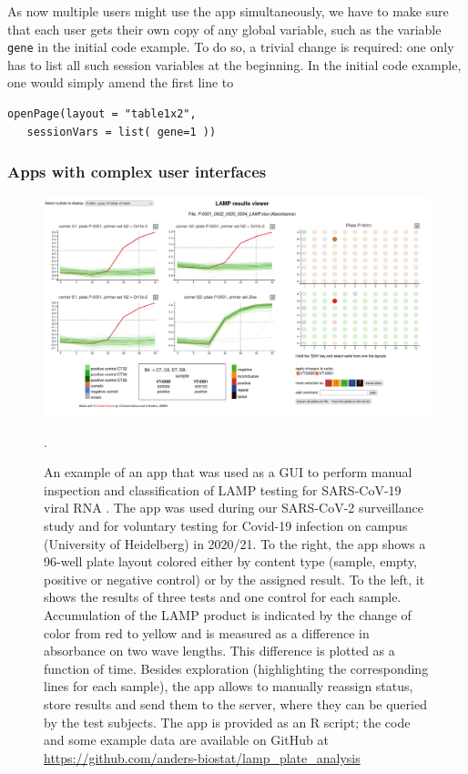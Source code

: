 \documentclass[twocolumn,10pt]{article}
\begin{document}
As now multiple users might use the app simultaneously, we have to make sure that each user gets their own copy of any global variable, such as the variable \texttt{gene} in the initial code example. To do so, a trivial change is required: one only has to list all such session variables at the beginning. In the initial code example, one would simply amend the first line to 
\begin{verbatim}
openPage(layout = "table1x2", 
   sessionVars = list( gene=1 ))
\end{verbatim}

\subsubsection{Apps with complex user interfaces}\label{gui_apps}

\begin{figure}[t]
   \includegraphics[width=\textwidth]{FigG/figG.png}
   \caption{An example of an app that was used as a GUI to perform manual inspection and classification of LAMP testing for SARS-CoV-19 viral RNA \citep{daothi_2020}. The app was used during our SARS-CoV-2 surveillance study \citep{deckert_2021} and for voluntary testing for Covid-19 infection on campus (University of Heidelberg) in 2020/21. To the right, the app shows a 96-well plate layout colored either by content type (sample, empty, positive or negative control) or by the assigned result. To the left, it shows the results of three tests and one control for each sample. Accumulation of the LAMP product is indicated by the change of color from red to yellow and is measured as a difference in absorbance on two wave lengths. This difference is plotted as a function of time. Besides exploration (highlighting the corresponding lines for each sample), the app allows to manually reassign status, store results and send them to the server, where they can be queried by the test subjects. The app is provided as an R script; the code and some example data are available on GitHub at \url{https://github.com/anders-biostat/lamp_plate_analysis}}.
   \label{lc_FigG}
\end{figure}
\end{document}
